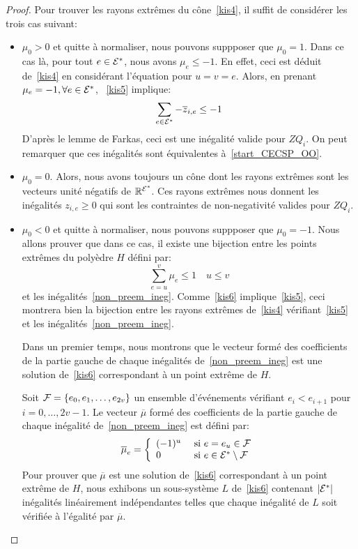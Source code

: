 \begin{proof}
Pour trouver les rayons extrêmes du cône~\eqref{kis4}, il suffit de
considérer les trois cas suivant: 
\begin{itemize}
\item $\mu_0 > 0$ et quitte à normaliser, nous pouvons suppposer que
  $\mu_0=1$. Dans ce cas là, pour tout $e \in {\cal E}^*$, nous avons
  $\mu_e \le -1$. En effet, ceci est déduit de~\eqref{kis4} en
  considérant l'équation pour $u=v=e$. Alors, en prenant
  $\mu_e=-1,\forall e \in {\cal E}^*$, ~\eqref{kis5} implique:
\[ \sum_{e \in {\cal E}^*} - \overline{z}_{i,e} \le -1 \]
D'après le lemme de Farkas, ceci est une inégalité valide pour
$ZQ_i$. On peut remarquer que ces inégalités sont équivalentes
à~\eqref{start_CECSP_OO}. 
\item $\mu_0=0$. Alors, nous avons toujours un cône dont les rayons
  extrêmes sont les vecteurs unité négatifs de $\mathbb{R}^{{\cal E}^*}$. Ces
  rayons extrêmes nous donnent les inégalités $z_{i,e} \ge 0$ qui sont
  les contraintes de non-negativité valides pour $ZQ_i$. 
\item $\mu_0 < 0$ et quitte à normaliser, nous pouvons suppposer que
  $\mu_0=-1$. Nous allons prouver que dans ce cas, il existe une
  bijection entre les points extrêmes du polyèdre $H$ défini par:
  \begin{equation} \sum_{e=u}^{v} \mu_e \le 1 \quad u \le
    v \label{kis6}
  \end{equation} et les
  inégalités~\eqref{non_preem_ineg}. Comme~\eqref{kis6}
  implique~\eqref{kis5}, ceci montrera bien la bijection
  entre les rayons extrêmes de~\eqref{kis4} vérifiant~\eqref{kis5} et
  les inégalités~\eqref{non_preem_ineg}.

  Dans un premier temps, nous montrons que le vecteur formé des
  coefficients de la partie gauche de chaque inégalités
  de~\eqref{non_preem_ineg} est une solution de~\eqref{kis6}
  correspondant à un point extrême de $H$. 

  Soit ${\cal F}=\{e_0,e_1,\dots,e_{2v}\}$ un ensemble d'événements
  vérifiant $e_i<e_{i+1}$ pour $i=0,\dots,2v-1$. Le vecteur
  $\overline{\mu}$ formé des coefficients de la partie gauche de chaque
  inégalité de~\eqref{non_preem_ineg} est défini par:
  \[ \overline{\mu}_e=\left\{ 
      \begin{array}{ll}
        (-1)^u & \text{ si } e=e_u \in \cal F \\
        0 & \text{ si } e \in {\cal E}^* \setminus \cal F
      \end{array}
    \right.
  \]
  Pour prouver que $\overline{\mu}$ est une solution de~\eqref{kis6}
  correspondant à un point extrême de $H$, nous exhibons un
  sous-système $L$ de~\eqref{kis6} 
  contenant $|{\cal E}^*|$ inégalités linéairement indépendantes telles que
  chaque inégalité de $L$ soit vérifiée à l'égalité par
  $\overline{\mu}$. 


\end{itemize}
\end{proof}
